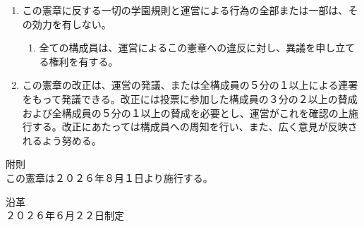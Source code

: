 \documentclass[
  report,
  fontsize   = 12pt,
  paper      = a4,
  head_space = 20mm,
  foot_space = 20mm,
  gutter     = 20mm,
  fore-edge  = 20mm
  ]{jlreq}
\begin{document}
\begin{enumerate}[label=第\arabic*条　]
  \item この憲章に反する一切の学園規則と運営による行為の全部または一部は、その効力を有しない。
    \begin{enumerate}[label=\arabic*　,start=2,leftmargin=*]
      \item 全ての構成員は、運営によるこの憲章への違反に対し、異議を申し立てる権利を有する。
    \end{enumerate}
  \item この憲章の改正は、運営の発議、または全構成員の５分の１以上による連署をもって発議できる。改正には投票に参加した構成員の３分の２以上の賛成および全構成員の５分の１以上の賛成を必要とし、運営がこれを確認の上施行する。改正にあたっては構成員への周知を行い、また、広く意見が反映されるよう努める。
\end{enumerate}

附則\\
この憲章は２０２６年８月１日より施行する。

沿革\\
２０２６年６月２２日制定
\end{document}
